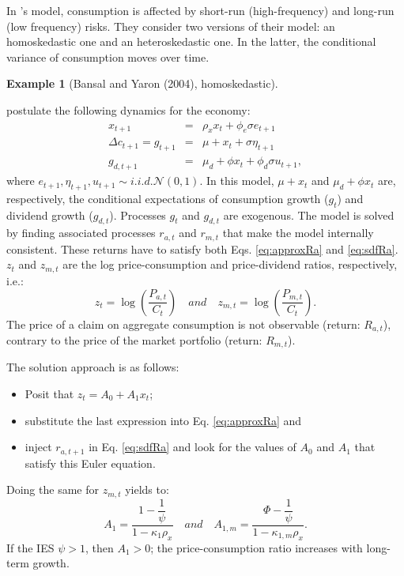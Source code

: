 \documentclass[
  12pt,
]{book}
\providecommand{\tightlist}{%
  \setlength{\itemsep}{0pt}\setlength{\parskip}{0pt}}
\theoremstyle{definition}
\theoremstyle{definition}
\newtheorem{example}{Example}[chapter]
\theoremstyle{definition}
\theoremstyle{definition}
\theoremstyle{remark}
\begin{document}
In \citet{Bansal_Yaron_2004}'s model, consumption is affected by short-run (high-frequency) and long-run (low frequency) risks. They consider two versions of their model: an homoskedastic one and an heteroskedastic one. In the latter, the conditional variance of consumption moves over time.

\begin{example}[Bansal and Yaron (2004), homoskedastic]
\protect\hypertarget{exm:BYHomsk}{}\label{exm:BYHomsk}

\citet{Bansal_Yaron_2004} postulate the following dynamics for the economy:
\begin{eqnarray*}
x_{t+1} &=& \rho_x x_t + \phi_e \sigma e_{t+1}\\
\Delta c_{t+1} = g_{t+1} &=& \mu + x_t + \sigma \eta_{t+1}\\
g_{d,t+1} &=& \mu_d + \phi x_t + \phi_d \sigma u_{t+1},
\end{eqnarray*}
where \(e_{t+1},\eta_{t+1},u_{t+1} \sim i.i.d. \mathcal{N}(0,1)\). In this model,
\(\mu + x_t\) and \(\mu_d + \phi x_t\) are, respectively, the conditional expectations of consumption growth (\(g_t\)) and dividend growth (\(g_{d,t}\)). Processes \(g_t\) and \(g_{d,t}\) are exogenous. The model is solved by finding associated processes \(r_{a,t}\) and \(r_{m,t}\) that make the model internally consistent. These returns have to satisfy both Eqs. \eqref{eq:approxRa} and \eqref{eq:sdfRa}.
\(z_t\) and \(z_{m,t}\) are the log price-consumption and price-dividend ratios, respectively, i.e.:
\[
z_t = \log\left(\frac{P_{a,t}}{C_t}\right) \quad and \quad z_{m,t} = \log\left(\frac{P_{m,t}}{C_t}\right).
\]
The price of a claim on aggregate consumption is not observable (return: \(R_{a,t}\)), contrary to the price of the market portfolio (return: \(R_{m,t}\)).

The solution approach is as follows:

\begin{itemize}
\tightlist
\item
  Posit that \(z_t = A_0 + A_1 x_t\);
\item
  substitute the last expression into Eq. \eqref{eq:approxRa} and
\item
  inject \(r_{a,t+1}\) in Eq. \eqref{eq:sdfRa} and look for the values of \(A_0\) and \(A_1\) that satisfy this Euler equation.
\end{itemize}

Doing the same for \(z_{m,t}\) yields to:
\begin{equation}
A_1 = \frac{1- \dfrac{1}{\psi}}{1 - \kappa_1 \rho_x} \quad and \quad A_{1,m} = \frac{\Phi- \dfrac{1}{\psi}}{1 - \kappa_{1,m} \rho_x}.\label{eq:solABY1}
\end{equation}
If the IES \(\psi > 1\), then \(A_1 > 0\); the price-consumption ratio increases with long-term growth.


\end{example}
\end{document}
